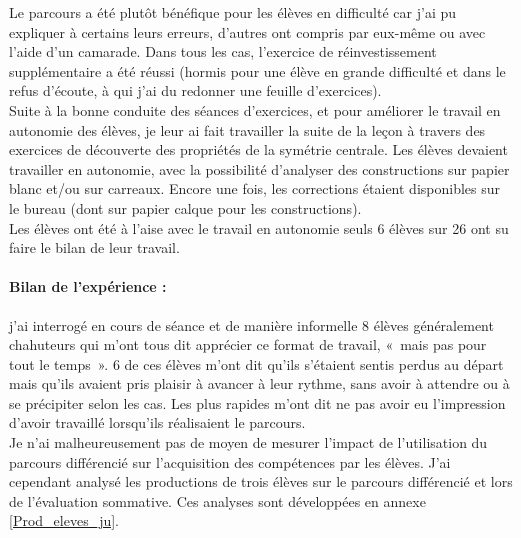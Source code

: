 Le parcours a été plutôt bénéfique pour les élèves en difficulté car j'ai pu expliquer à certains leurs erreurs, d'autres ont compris par eux-même ou avec l'aide d'un camarade. Dans tous les cas, l'exercice de réinvestissement supplémentaire a été réussi (hormis pour une élève en grande difficulté et dans le refus d'écoute, à qui j'ai du redonner une feuille d'exercices).\\
Suite à la bonne conduite des séances d'exercices, et pour améliorer le travail en autonomie des élèves, je leur ai fait travailler la suite de la leçon à travers des exercices de découverte des propriétés de la symétrie centrale. Les élèves devaient travailler en autonomie, avec la possibilité d'analyser des constructions sur papier blanc et/ou sur carreaux. Encore une fois, les corrections étaient disponibles sur le bureau (dont sur papier calque pour les constructions).\\
Les élèves ont été à l'aise avec le travail en autonomie seuls 6 élèves sur 26 ont su faire le bilan de leur travail.

\paragraph{Bilan de l'expérience :}j'ai interrogé en cours de séance et de manière informelle 8 élèves généralement chahuteurs qui m'ont tous dit apprécier ce format de travail, « mais pas pour tout le temps ». 6 de ces élèves m'ont dit qu'ils s'étaient sentis perdus au départ mais qu'ils avaient pris plaisir à avancer à leur rythme, sans avoir  à attendre ou à se précipiter selon les cas. Les plus rapides m'ont dit ne pas avoir eu l'impression d'avoir travaillé lorsqu'ils réalisaient le parcours.\\
Je n'ai malheureusement pas de moyen de mesurer l'impact de l'utilisation du parcours différencié sur l'acquisition des compétences par les élèves. J'ai cependant analysé les productions de trois élèves sur le parcours différencié et lors de l'évaluation sommative. Ces analyses sont développées en annexe \ref{Prod_eleves_ju}.


